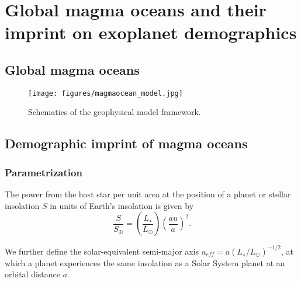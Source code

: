 \documentclass[modern]{aastex631}
\begin{document}
\section{Global magma oceans and their imprint on exoplanet demographics}
\subsection{Global magma oceans}

\begin{figure}[!ht]
    \begin{centering}
        \texttt{[image: figures/magmaocean\_model.jpg]}
        \caption{Schematics of the geophysical model framework.}
        \label{fig:magmaocean_model}
    \end{centering}
\end{figure}


\subsection{Demographic imprint of magma oceans}

\subsubsection{Parametrization}
\label{sec:mo_model}

\Blindtext[1]


\begin{note}
    The power from the host star per unit area at the position of a planet or stellar insolation $S$ in units of Earth's insolation is given by
    \begin{equation}
        \frac{S}{S_\oplus} = \left(\frac{L_\star}{L_\odot}\right) \left(\frac{au}{a}\right)^2 .
    \end{equation}

    We further define the solar-equivalent semi-major axis $a_{eff} = a (L_\star/L_\odot)^{-1/2}$, at which a planet experiences the same insolation as a Solar System planet at an orbital distance $a$.
\end{note}
\end{document}
